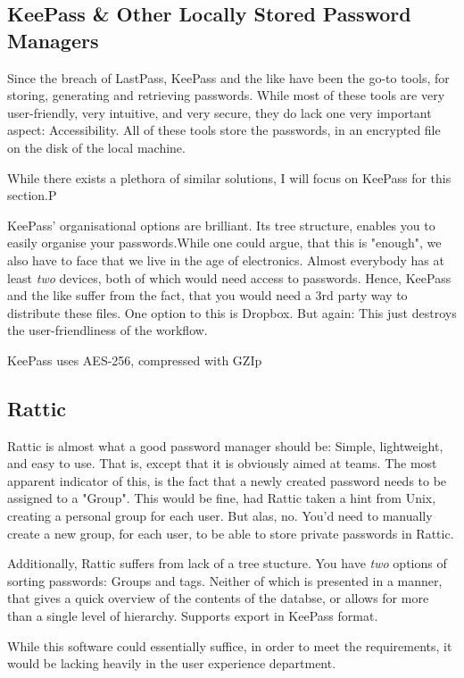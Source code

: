 		\subsection{KeePass \& Other Locally Stored Password Managers}
			Since the breach of LastPass, KeePass and the like have been the go-to tools, for storing, generating and retrieving passwords. While most of these tools are very user-friendly, very intuitive, and very secure, they do lack one very important aspect: Accessibility. All of these tools store the passwords, in an encrypted file on the disk of the local machine.

			While there exists a plethora of similar solutions, I will focus on KeePass for this section.P

			KeePass' organisational options are brilliant. Its tree structure, enables you to easily organise your passwords.While one could argue, that this is "enough", we also have to face that we live in the age of electronics. Almost everybody has at least \emph{two} devices, both of which would need access to passwords. Hence, KeePass and the like suffer from the fact, that you would need a 3rd party way to distribute these files. One option to this is Dropbox. But again: This just destroys the user-friendliness of the workflow.

			KeePass uses AES-256, compressed with GZIp


		\subsection{Rattic}
			Rattic is almost what a good password manager should be: Simple, lightweight, and easy to use. That is, except that it is obviously aimed at teams. The most apparent indicator of this, is the fact that a newly created password needs to be assigned to a "Group". This would be fine, had Rattic taken a hint from Unix, creating a personal group for each user. But alas, no. You'd need to manually create a new group, for each user, to be able to store private passwords in Rattic.

			Additionally, Rattic suffers from lack of a tree stucture. You have \emph{two} options of sorting passwords: Groups and tags. Neither of which is presented in a manner, that gives a quick overview of the contents of the databse, or allows for more than a single level of hierarchy. Supports export in KeePass format.
			
			While this software could essentially suffice, in order to meet the requirements, it would be lacking heavily in the user experience department.


